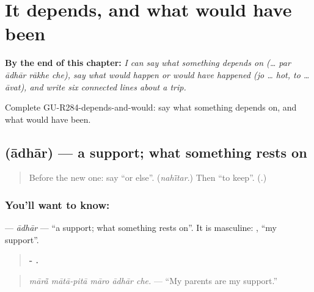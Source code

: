 
\chapter{It depends, and what would have been}
\label{ch:gu-it-depends-and-what-would-have-been}

\begin{chapteropening}
\textbf{By the end of this chapter:} \emph{I can say what something depends on (… par ādhār rākhe che), say what would happen or would have happened (jo … hot, to … āvat), and write six connected lines about a trip.}

Complete GU-R284-depends-and-would: say what something depends on, and what would have been.
\end{chapteropening}

\section[\texorpdfstring{\gu{આધાર} (ādhār)}{આધાર (ādhār)}]{ (ādhār) — a support; what something rests on}

\label{lesson:GU-C284-adhar}



\begin{quote}
Before the new one: say \textquotedblleft{}or else\textquotedblright{}. (\emph{nahī̃tar}.) Then \textquotedblleft{}to keep\textquotedblright{}. (\textbf{}.)
\end{quote}

\subsection*{You'll want to know: }
\textbf{} — \emph{ādhār} — \textquotedblleft{}a support; what something rests on\textquotedblright{}. It is masculine: \textbf{ }, \textquotedblleft{}my support\textquotedblright{}.

\begin{quote}
\textbf{ -   .}
\end{quote}

\begin{quote}
\emph{mārā̃ mātā-pitā māro ādhār che.} — \textquotedblleft{}My parents are my support.\textquotedblright{}
\end{quote}

